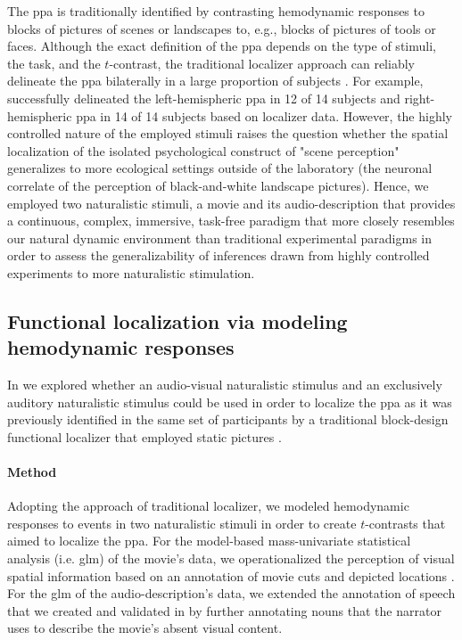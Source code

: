 %
The \ac{ppa} is traditionally identified by contrasting hemodynamic responses to
blocks of pictures of scenes or landscapes to, e.g., blocks of pictures of tools
or faces.
%
Although the exact definition of the \ac{ppa} depends on the type of stimuli,
the task, and the $t$-contrast, the traditional localizer approach can reliably
delineate the \ac{ppa} bilaterally in a large proportion of subjects
\citep[e.g.,][]{zhen2017quantifying}.
%
For example, \citet{sengupta2016extension} successfully delineated the
left-hemispheric \ac{ppa} in 12 of 14 subjects and right-hemispheric \ac{ppa} in
14 of 14 subjects based on localizer data.
%
However, the highly controlled nature of the employed stimuli raises the
question whether the spatial localization of the isolated psychological
construct of "scene perception" generalizes to more ecological settings outside
of the laboratory (the neuronal correlate of the perception of black-and-white
landscape pictures).
%
Hence, we employed two naturalistic stimuli, a movie and its audio-description
that provides a continuous, complex, immersive, task-free paradigm that more
closely resembles our natural dynamic environment than traditional experimental
paradigms in order to assess the generalizability of inferences drawn from
highly controlled experiments to more naturalistic stimulation.



\subsection{Functional localization via modeling hemodynamic responses}


In \citet{haeusler2022processing} we explored whether an audio-visual
naturalistic stimulus and an exclusively auditory naturalistic stimulus could be
used in order to localize the \ac{ppa} as it was previously identified in the
same set of participants by a traditional block-design functional localizer that
employed static pictures \citep{sengupta2016extension}.


\paragraph{Method}
Adopting the approach of traditional localizer, we modeled hemodynamic responses
to events in two naturalistic stimuli in order to create $t$-contrasts that
aimed to localize the \ac{ppa}.
For the model-based mass-univariate statistical analysis (i.e. \ac{glm}) of the
movie's data, we operationalized the perception of visual spatial information
based on an annotation of movie cuts and depicted locations
\citep{haeusler2016cutanno}.
For the \ac{glm} of the audio-description's data, we extended the annotation of
speech that we created and validated in \citep{haeusler2021speechanno} by
further annotating nouns that the narrator uses to describe the movie's absent
visual content.


